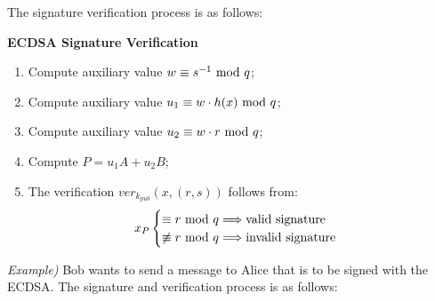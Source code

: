 \newpage
\hfill\break
The signature verification process is as follows:
\begin{framed}
    \hfill\break\textbf{ECDSA Signature Verification}
    \begin{enumerate}
        \item Compute auxiliary value $w\equiv s^{-1}\text{ mod } q$;
        \item Compute auxiliary value $u_1\equiv w\cdot h(x)\text{ mod } q$;
        \item Compute auxiliary value $u_2\equiv w\cdot r\text{ mod } q$;
        \item Compute $P=u_1A+u_2B$;
        \item The verification $ver_{k_{pub}}(x,(r,s))$ follows from:
        \begin{equation*}
            x_P\begin{cases}
                \equiv r\text{ mod } q\Longrightarrow\text{valid signature}\\
                \not\equiv r\text{ mod } q\Longrightarrow\text{invalid signature}
            \end{cases}
        \end{equation*}
    \end{enumerate}
\end{framed}
\hfill\break
\textit{Example)} Bob wants to send a message to Alice that is to be signed with the ECDSA. The signature and verification process is as follows:
